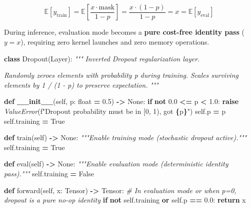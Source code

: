 \documentclass[
  letterpaper,
]{scrbook}
\newenvironment{Shaded}{\begin{snugshade}}{\end{snugshade}}
\newcommand{\BuiltInTok}[1]{#1}
\newcommand{\CommentTok}[1]{\textcolor[rgb]{0.56,0.35,0.01}{\textit{#1}}}
\newcommand{\ControlFlowTok}[1]{\textcolor[rgb]{0.13,0.29,0.53}{\textbf{#1}}}
\newcommand{\FloatTok}[1]{\textcolor[rgb]{0.00,0.00,0.81}{#1}}
\newcommand{\FunctionTok}[1]{\textcolor[rgb]{0.13,0.29,0.53}{\textbf{#1}}}
\newcommand{\KeywordTok}[1]{\textcolor[rgb]{0.13,0.29,0.53}{\textbf{#1}}}
\newcommand{\NormalTok}[1]{#1}
\newcommand{\OperatorTok}[1]{\textcolor[rgb]{0.81,0.36,0.00}{\textbf{#1}}}
\newcommand{\PreprocessorTok}[1]{\textcolor[rgb]{0.56,0.35,0.01}{\textit{#1}}}
\newcommand{\SpecialCharTok}[1]{\textcolor[rgb]{0.81,0.36,0.00}{\textbf{#1}}}
\newcommand{\SpecialStringTok}[1]{\textcolor[rgb]{0.31,0.60,0.02}{#1}}
\newcommand{\VariableTok}[1]{\textcolor[rgb]{0.00,0.00,0.00}{#1}}
\begin{document}
\[\mathbb{E}[y_{\text{train}}] = \mathbb{E}\left[\frac{x \cdot \text{mask}}{1 - p}\right] = \frac{x \cdot (1 - p)}{1 - p} = x = \mathbb{E}[y_{\text{eval}}]\]

During inference, evaluation mode becomes a \textbf{pure cost-free
identity pass} (\(y = x\)), requiring zero kernel launches and zero
memory operations.

\begin{Shaded}
\begin{Highlighting}[]
\KeywordTok{class}\NormalTok{ Dropout(Layer):}
    \CommentTok{"""}
\CommentTok{    Inverted Dropout regularization layer.}

\CommentTok{    Randomly zeroes elements with probability p during training.}
\CommentTok{    Scales surviving elements by 1 / (1 {-} p) to preserve expectation.}
\CommentTok{    """}

    \KeywordTok{def} \FunctionTok{\_\_init\_\_}\NormalTok{(}\VariableTok{self}\NormalTok{, p: }\BuiltInTok{float} \OperatorTok{=} \FloatTok{0.5}\NormalTok{) }\OperatorTok{{-}\textgreater{}} \VariableTok{None}\NormalTok{:}
        \ControlFlowTok{if} \KeywordTok{not} \FloatTok{0.0} \OperatorTok{\textless{}=}\NormalTok{ p }\OperatorTok{\textless{}} \FloatTok{1.0}\NormalTok{:}
            \ControlFlowTok{raise} \PreprocessorTok{ValueError}\NormalTok{(}\SpecialStringTok{f"Dropout probability must be in [0, 1), got }\SpecialCharTok{\{}\NormalTok{p}\SpecialCharTok{\}}\SpecialStringTok{"}\NormalTok{)}
        \VariableTok{self}\NormalTok{.p }\OperatorTok{=}\NormalTok{ p}
        \VariableTok{self}\NormalTok{.training }\OperatorTok{=} \VariableTok{True}

    \KeywordTok{def}\NormalTok{ train(}\VariableTok{self}\NormalTok{) }\OperatorTok{{-}\textgreater{}} \VariableTok{None}\NormalTok{:}
        \CommentTok{"""Enable training mode (stochastic dropout active)."""}
        \VariableTok{self}\NormalTok{.training }\OperatorTok{=} \VariableTok{True}

    \KeywordTok{def} \BuiltInTok{eval}\NormalTok{(}\VariableTok{self}\NormalTok{) }\OperatorTok{{-}\textgreater{}} \VariableTok{None}\NormalTok{:}
        \CommentTok{"""Enable evaluation mode (deterministic identity pass)."""}
        \VariableTok{self}\NormalTok{.training }\OperatorTok{=} \VariableTok{False}

    \KeywordTok{def}\NormalTok{ forward(}\VariableTok{self}\NormalTok{, x: Tensor) }\OperatorTok{{-}\textgreater{}}\NormalTok{ Tensor:}
        \CommentTok{\# In evaluation mode or when p=0, dropout is a pure no{-}op identity}
        \ControlFlowTok{if} \KeywordTok{not} \VariableTok{self}\NormalTok{.training }\KeywordTok{or} \VariableTok{self}\NormalTok{.p }\OperatorTok{==} \FloatTok{0.0}\NormalTok{:}
            \ControlFlowTok{return}\NormalTok{ x}


\end{Highlighting}
\end{Shaded}
\end{document}
